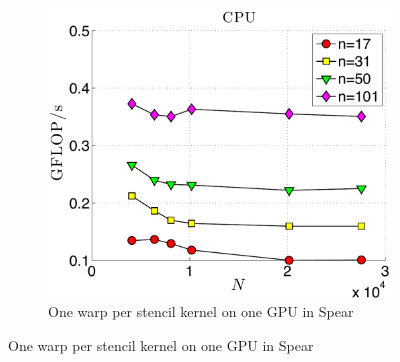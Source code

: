 \begin{figure}
\centering
\begin{subfigure}[t]{0.425\textwidth}
\includegraphics[width=1.0\textwidth]{../figures/spear_results/vortex/gflops_cpu_1proc_oneWarpPerStencil.pdf}
\caption{One warp per stencil kernel on one GPU in Spear  }
\label{fig:spear_alltoall_1proc_warp}
\end{subfigure} 


\end{figure}
